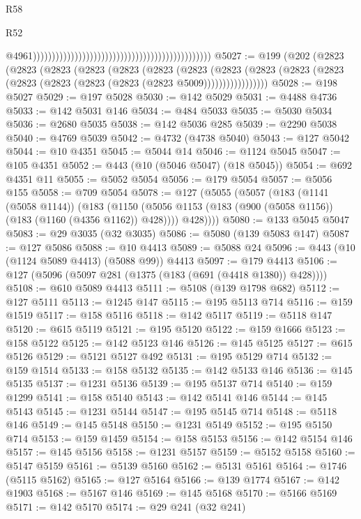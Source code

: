 \begin{lexlean}{R58}
\begin{lexlean}{R52}
\begin{coremodule}
{{{{{{{{{{{{{{{{{{{{{{{{{{{{{{{{{{{{{{{{{{{{{{{{{{{{{{{{{{{{{{{{{{{{{{{{{{{{{{{{{{{{{{{{{{{{{{{{{{{{{{{{{{{{{{{{{{{{{{{{{{{{{{{{{{{{{{{{{{{{{{{{{{{{{{{{{{{{{{{{{{{{{{{{{{{{{{{{{{{{{{{{{{{{{{{{{{{{{{                                                                                                  @4961)))))))))))))))))))))))))))))))))))))))))))))))
@5027 := @199
    (@202
      (@2823
        (@2823
          (@2823
            (@2823
              (@2823
                (@2823
                  (@2823
                    (@2823
                      (@2823 (@2823 (@2823 (@2823 (@2823 (@2823 (@2823 (@2823 @5009)))))))))))))))))
@5028 := @198 @5027
@5029 := @197 @5028
@5030 := @142 @5029
@5031 := @4488 @4736
@5033 := @142 @5031 @146
@5034 := @484 @5033
@5035 := @5030 @5034
@5036 := @2680 @5035
@5038 := @142 @5036 @285
@5039 := @2290 @5038
@5040 := @4769 @5039
@5042 := @4732 (@4738 @5040)
@5043 := @127 @5042
@5044 := @10 @4351
@5045 := @5044 @14
@5046 := @1124 @5045
@5047 := @105 @4351
@5052 := @443 (@10 (@5046 @5047) (@18 @5045))
@5054 := @692 @4351 @11
@5055 := @5052 @5054
@5056 := @179 @5054
@5057 := @5056 @155
@5058 := @709 @5054
@5078 := @127
    (@5055
      (@5057
        (@183
          (@1141 (@5058 @1144))
          (@183
            (@1150 (@5056 @1153 (@183 (@900 (@5058 @1156)) (@183 (@1160 (@4356 @1162)) @428))))
            @428))))
@5080 := @133 @5045 @5047
@5083 := @29 @3035 (@32 @3035)
@5086 := @5080 (@139 @5083 @147)
@5087 := @127 @5086
@5088 := @10 @4413
@5089 := @5088 @24
@5096 := @443 (@10 (@1124 @5089 @4413) (@5088 @99)) @4413
@5097 := @179 @4413
@5106 := @127 (@5096 (@5097 @281 (@1375 (@183 (@691 (@4418 @1380)) @428))))
@5108 := @610 @5089 @4413
@5111 := @5108 (@139 @1798 @682)
@5112 := @127 @5111
@5113 := @1245 @147
@5115 := @195 @5113 @714
@5116 := @159 @1519
@5117 := @158 @5116
@5118 := @142 @5117
@5119 := @5118 @147
@5120 := @615 @5119
@5121 := @195 @5120
@5122 := @159 @1666
@5123 := @158 @5122
@5125 := @142 @5123 @146
@5126 := @145 @5125
@5127 := @615 @5126
@5129 := @5121 @5127 @492
@5131 := @195 @5129 @714
@5132 := @159 @1514
@5133 := @158 @5132
@5135 := @142 @5133 @146
@5136 := @145 @5135
@5137 := @1231 @5136
@5139 := @195 @5137 @714
@5140 := @159 @1299
@5141 := @158 @5140
@5143 := @142 @5141 @146
@5144 := @145 @5143
@5145 := @1231 @5144
@5147 := @195 @5145 @714
@5148 := @5118 @146
@5149 := @145 @5148
@5150 := @1231 @5149
@5152 := @195 @5150 @714
@5153 := @159 @1459
@5154 := @158 @5153
@5156 := @142 @5154 @146
@5157 := @145 @5156
@5158 := @1231 @5157
@5159 := @5152 @5158
@5160 := @5147 @5159
@5161 := @5139 @5160
@5162 := @5131 @5161
@5164 := @1746 (@5115 @5162)
@5165 := @127 @5164
@5166 := @139 @1774
@5167 := @142 @1903
@5168 := @5167 @146
@5169 := @145 @5168
@5170 := @5166 @5169
@5171 := @142 @5170
@5174 := @29 @241 (@32 @241)
}}}}}}}}}}}}}}}}}}}}}}}}}}}}}}}}}}}}}}}}}}}}}}}}}}}}}}}}}}}}}}}}}}}}}}}}}}}}}}}}}}}}}}}}}}}}}}}}}}}}}}}}}}}}}}}}}}}}}}}}}}}}}}}}}}}}}}}}}}}}}}}}}}}}}}}}}}}}}}}}}}}}}}}}}}}}}}}}}}}}}}}}}}}}}}}}}}}}}}
\end{coremodule}
\end{lexlean}
\end{lexlean}
